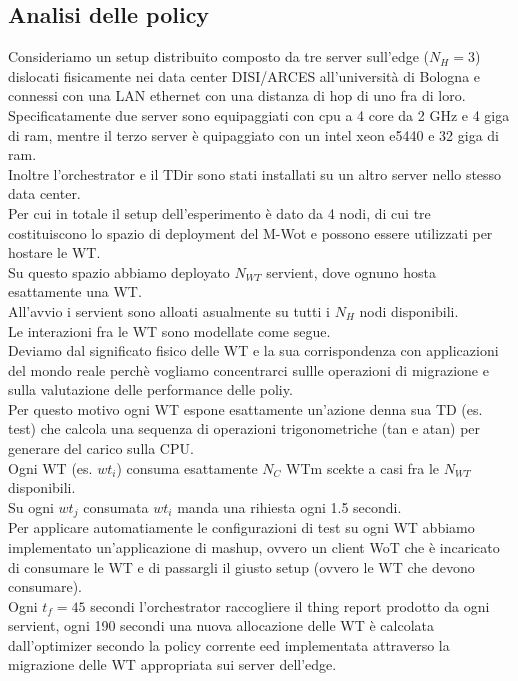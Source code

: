 \documentclass[11pt]{article}
\begin{document}
	\subsection{Analisi delle policy}
	Consideriamo un setup distribuito composto da tre server sull'edge ($N_H = 3$) dislocati fisicamente nei data center DISI/ARCES all'università di Bologna e connessi con una LAN ethernet con una distanza di hop di uno fra di loro. \\
	Specificatamente due server sono equipaggiati con cpu a 4 core da 2 GHz e 4 giga di ram, mentre il terzo server è quipaggiato con un intel xeon e5440 e 32 giga di ram. \\
	Inoltre l'orchestrator e il TDir sono stati installati su un altro server nello stesso data center. \\
	Per cui in totale il setup dell'esperimento è dato da 4 nodi, di cui tre costituiscono lo spazio di deployment del M-Wot e possono essere utilizzati per hostare le WT. \\
	Su questo spazio abbiamo deployato $N_{WT}$ servient, dove ognuno hosta esattamente una WT. \\
	All'avvio i servient sono alloati asualmente su tutti i $N_H$ nodi disponibili.\\
	Le interazioni fra le WT sono modellate come segue. \\
	Deviamo dal significato fisico delle WT e la sua corrispondenza con applicazioni del mondo reale perchè vogliamo concentrarci sullle operazioni di migrazione e sulla valutazione delle performance delle poliy. \\
	Per questo motivo ogni WT espone esattamente un'azione denna sua TD (es. test) che calcola una sequenza di operazioni trigonometriche (tan e atan) per generare del carico sulla CPU. \\
	Ogni WT (es. $wt_i$) consuma esattamente $N_C$ WTm scekte a casi fra le $N_{WT}$ disponibili. \\
	Su ogni $wt_j$ consumata $wt_i$ manda una rihiesta ogni 1.5 secondi. \\
	Per applicare automatiamente le configurazioni di test su ogni WT abbiamo implementato un'applicazione di mashup, ovvero un client WoT che è incaricato di consumare le WT e di passargli il giusto setup (ovvero le WT che devono consumare). \\
	Ogni $t_f = 45$ secondi l'orchestrator raccogliere il thing report prodotto da ogni servient, ogni 190 secondi una nuova allocazione delle WT è calcolata dall'optimizer secondo la policy corrente eed implementata attraverso la migrazione delle WT appropriata sui server dell'edge. \\
\end{document}

